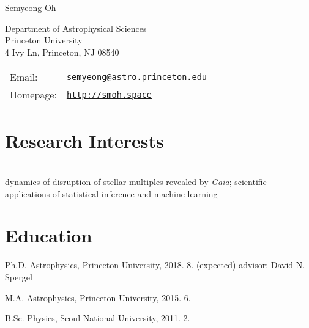 \documentclass[11pt,letterpaper]{article}
\renewenvironment{itemize}{
  \begin{list}{}{
    \setlength{\leftmargin}{1.5em}
  }
}{
  \end{list}
}
\def\name{Semyeong Oh}
\begin{document}
{\huge \name}

\vspace{0.1in}

\begin{minipage}{0.45\linewidth}
  Department of Astrophysical Sciences \\
  Princeton University \\
  4 Ivy Ln, Princeton, NJ 08540
\end{minipage}
\begin{minipage}{0.45\linewidth}
  \begin{tabular}{ll}
    Email: & \href{mailto:semyeong@astro.princeton.edu}{\tt semyeong@astro.princeton.edu}\\
    Homepage: & \href{http://smoh.space}{\tt http://smoh.space} \\
  \end{tabular}
\end{minipage}


\section*{Research Interests}~\\

\vspace{-0.3cm}
dynamics of disruption of stellar multiples revealed by {\it Gaia};
scientific applications of statistical inference and machine learning

\section*{Education}

\begin{itemize}
  \setlength\itemsep{0.2em}
  \item Ph.D. Astrophysics, Princeton University, 2018. 8. (expected)
    advisor: David N. Spergel

  \item M.A. Astrophysics, Princeton University, 2015. 6.


  \item B.Sc. Physics, Seoul National University, 2011. 2.
\end{itemize}
\end{document}
